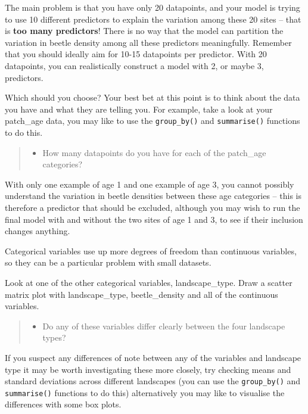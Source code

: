 \documentclass[
]{book}
\providecommand{\tightlist}{%
  \setlength{\itemsep}{0pt}\setlength{\parskip}{0pt}}
\begin{document}
The main problem is that you have only 20 datapoints, and your model is trying to use 10 different predictors to explain the variation among these 20 sites -- that is \textbf{too many predictors}! There is no way that the model can partition the variation in beetle density among all these predictors meaningfully. Remember that you should ideally aim for 10-15 datapoints per predictor. With 20 datapoints, you can realistically construct a model with 2, or maybe 3, predictors.

Which should you choose? Your best bet at this point is to think about the data you have and what they are telling you. For example, take a look at your patch\_age data, you may like to use the \texttt{group\_by()} and \texttt{summarise()} functions to do this.

\begin{quote}
\begin{itemize}
\tightlist
\item
  How many datapoints do you have for each of the patch\_age categories?
\end{itemize}
\end{quote}

With only one example of age 1 and one example of age 3, you cannot possibly understand the variation in beetle densities between these age categories -- this is therefore a predictor that should be excluded, although you may wish to run the final model with and without the two sites of age 1 and 3, to see if their inclusion changes anything.

Categorical variables use up more degrees of freedom than continuous variables, so they can be a particular problem with small datasets.

Look at one of the other categorical variables, landscape\_type. Draw a scatter matrix plot with landscape\_type, beetle\_density and all of the continuous variables.

\begin{quote}
\begin{itemize}
\tightlist
\item
  Do any of these variables differ clearly between the four landscape types?
\end{itemize}
\end{quote}

If you suspect any differences of note between any of the variables and landscape type it may be worth investigating these more closely, try checking means and standard deviations across different landscapes (you can use the \texttt{group\_by()} and \texttt{summarise()} functions to do this) alternatively you may like to visualise the differences with some box plots.
\end{document}
